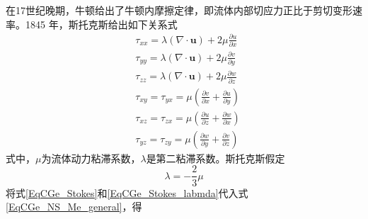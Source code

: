 在17世纪晚期，牛顿给出了牛顿内摩擦定律，即流体内部切应力正比于剪切变形速率。1845
年，斯托克斯给出如下关系式
\begin{equation}
  \begin{aligned}
    &\tau_{xx} = \lambda(\nabla\cdot\mathbf{u}) + 2\mu\frac{\partial u}{\partial x}
    \\&
    \tau_{yy} = \lambda(\nabla\cdot\mathbf{u}) + 2\mu\frac{\partial v}{\partial y}
    \\&
    \tau_{zz} = \lambda(\nabla\cdot\mathbf{u}) + 2\mu\frac{\partial w}{\partial z}
    \\&
    \tau_{xy} = \tau_{yx} =
    \mu
    \left(
    \frac{\partial v}{\partial x}+\frac{\partial u}{\partial y}
    \right)
    \\&
    \tau_{xz} = \tau_{zx} =
    \mu
    \left(
    \frac{\partial u}{\partial z}+\frac{\partial w}{\partial x}
    \right)
    \\&
    \tau_{yz} = \tau_{zy} =
    \mu
    \left(
    \frac{\partial w}{\partial y}+\frac{\partial v}{\partial z}
    \right)
  \end{aligned}
  \label{EqCGe_Stokes}
\end{equation}
式中，$\mu$为流体动力粘滞系数，$\lambda$是第二粘滞系数。斯托克斯假定
\begin{equation}
  \lambda = -\frac{2}{3}\mu
  \label{EqCGe_Stokes_labmda}
\end{equation}
将式\eqref{EqCGe_Stokes}和\eqref{EqCGe_Stokes_labmda}代入式
\eqref{EqCGe_NS_Me_general}，得
